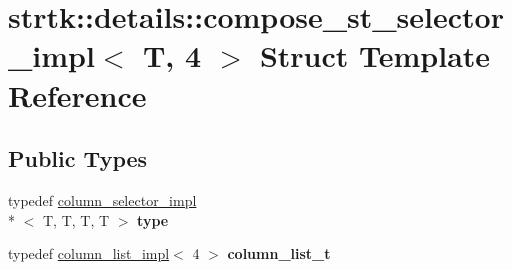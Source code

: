 \hypertarget{structstrtk_1_1details_1_1compose__st__selector__impl_3_01T_00_014_01_4}{\section{strtk\-:\-:details\-:\-:compose\-\_\-st\-\_\-selector\-\_\-impl$<$ T, 4 $>$ Struct Template Reference}
\label{structstrtk_1_1details_1_1compose__st__selector__impl_3_01T_00_014_01_4}
}
\subsection*{Public Types}
\begin{DoxyCompactItemize}
\item 
\hypertarget{structstrtk_1_1details_1_1compose__st__selector__impl_3_01T_00_014_01_4_a335cdb53cc079b5896f22ea756af571d}{typedef \hyperlink{classstrtk_1_1details_1_1column__selector__impl}{column\-\_\-selector\-\_\-impl}\\*
$<$ T, T, T, T $>$ {\bfseries type}}\label{structstrtk_1_1details_1_1compose__st__selector__impl_3_01T_00_014_01_4_a335cdb53cc079b5896f22ea756af571d}

\item 
\hypertarget{structstrtk_1_1details_1_1compose__st__selector__impl_3_01T_00_014_01_4_a916e82dc18270cdfd7c5e48a5cf3abd5}{typedef \hyperlink{structstrtk_1_1details_1_1column__list__impl}{column\-\_\-list\-\_\-impl}$<$ 4 $>$ {\bfseries column\-\_\-list\-\_\-t}}\label{structstrtk_1_1details_1_1compose__st__selector__impl_3_01T_00_014_01_4_a916e82dc18270cdfd7c5e48a5cf3abd5}

\end{DoxyCompactItemize}
